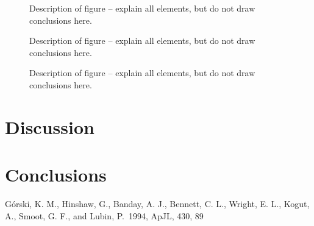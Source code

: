 \documentclass{emulateapj}
\begin{document}
\begin{figure}[t]
\mbox{}
\caption{Description of figure -- explain all elements, but do not
draw conclusions here.}
\label{fig:figure_label}
\end{figure}


\begin{figure}[t]
\mbox{}
\caption{Description of figure -- explain all elements, but do not
draw conclusions here.}
\label{fig:figure_label}
\end{figure}

\begin{figure}[t]
\mbox{}
\caption{Description of figure -- explain all elements, but do not
draw conclusions here.}
\label{fig:figure_label}
\end{figure}





\section{Discussion}
\label{sec:discussion}




\section{Conclusions}
\label{sec:conclusions}




%
%






\begin{acknowledgements}

\end{acknowledgements}

\begin{thebibliography}{}

 G{\'o}rski, K. M.,
  Hinshaw, G., Banday, A. J., Bennett, C. L., Wright, E. L., Kogut,
  A., Smoot, G. F., and Lubin, P.\ 1994, ApJL, 430, 89

\end{thebibliography}
\end{document}
